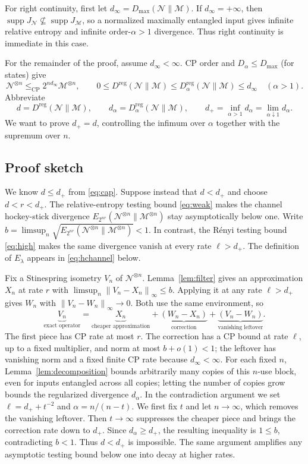 \documentclass[11pt,letterpaper]{article}
\numberwithin{equation}{section}
\newcommand{\N}{\mathcal N}
\newcommand{\M}{\mathcal M}
\newcommand{\supp}{\operatorname{supp}}
\newcommand{\reg}{\mathrm{reg}}
\newcommand{\cp}{\mathrm{CP}}
\newcommand{\Dt}{D}
\newcommand{\norm}[1]{\left\lVert#1\right\rVert}
\begin{document}
For right continuity, first let $d_\infty=D_{\max}(\N\|\M)$. If $d_\infty=+\infty$, then $\supp J_\N\not\subseteq\supp J_\M$, so a normalized maximally entangled input gives infinite relative entropy and infinite order-$\alpha>1$ divergence. Thus right continuity is immediate in this case.

For the remainder of the proof, assume $d_\infty<\infty$. CP order and  $\Dt_\alpha\le D_{\max}$ (for states) give
\begin{equation}\label{eq:cap}
 \N^{\otimes n}\le_{\cp}2^{n d_\infty}\M^{\otimes n},\qquad
 0\le D^{\reg}(\N\|\M)
 \le\Dt_\alpha^{\reg}(\N\|\M)\le d_\infty\quad(\alpha>1).
\end{equation}
Abbreviate
\begin{equation}\label{eq:thresholds}
 d=D^{\reg}(\N\|\M),\qquad
 d_\alpha=\Dt_\alpha^{\reg}(\N\|\M),\qquad
 d_+=\inf_{\alpha>1}d_\alpha=\lim_{\alpha\downarrow1}d_\alpha.
\end{equation}
We want to prove $d_+= d$, controlling the infimum over $\alpha$ together with the supremum over $n$.

\subsection{Proof sketch}\label{sec:sketch}
We know $d\le d_+$ from \eqref{eq:cap}. Suppose instead that $d<d_+$ and choose $d<r<d_+$. The relative-entropy testing bound \eqref{eq:weak} makes the channel hockey-stick divergence $E_{2^{nr}}(\N^{\otimes n}\|\M^{\otimes n})$ stay asymptotically below one. Write $b=\limsup_n\sqrt{E_{2^{nr}}(\N^{\otimes n}\|\M^{\otimes n})}<1$. In contrast, the R\'enyi testing bound \eqref{eq:high} makes the same divergence vanish at every rate $\ell>d_+$. The definition of $E_\lambda$ appears in \eqref{eq:hchannel} below.

Fix a Stinespring isometry $V_n$ of $\N^{\otimes n}$. Lemma~\ref{lem:filter} gives an approximation $X_n$ at rate $r$ with $\limsup_n\norm{V_n-X_n}_\infty\le b$. Applying it at any rate $\ell>d_+$ gives $W_n$ with $\norm{V_n-W_n}_\infty\to0$. Both use the same environment, so
\[
 \underbrace{V_n}_{\text{exact operator}}
 =\underbrace{X_n}_{\text{cheaper approximation}}
 +\underbrace{(W_n-X_n)}_{\text{correction}}
 +\underbrace{(V_n-W_n)}_{\text{vanishing leftover}}.
\]
The first piece has CP rate at most $r$. The correction has a CP bound at rate $\ell$, up to a fixed multiplier, and norm at most $b+o(1)<1$; the leftover has vanishing norm and a fixed finite CP rate because $d_\infty<\infty$. For each fixed $n$, Lemma~\ref{lem:decomposition} bounds arbitrarily many copies of this $n$-use block, even for inputs entangled across all copies; letting the number of copies grow bounds the regularized divergence $d_\alpha$. In the contradiction argument we set $\ell=d_++t^{-2}$ and $\alpha=n/(n-t)$. We first fix $t$ and let $n\to\infty$, which removes the vanishing leftover. Then $t\to\infty$ suppresses the cheaper piece and brings the correction rate down to $d_+$. Since $d_\alpha\ge d_+$, the resulting inequality is $1\le b$, contradicting $b<1$. Thus $d<d_+$ is impossible. The same argument amplifies any asymptotic testing bound below one into decay at higher rates.
\end{document}
